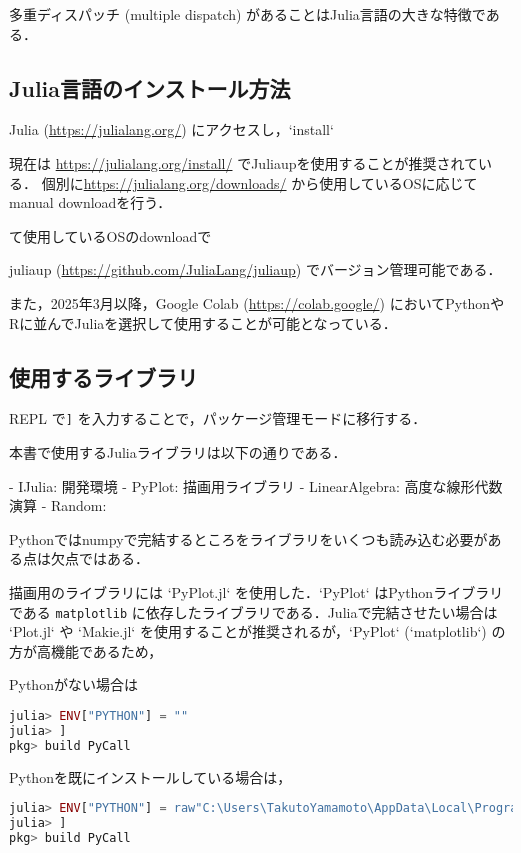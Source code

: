 \documentclass[titlepage]{ltjsbook}
\newcommand{\jl}{\lstinline[language=julia]}
\begin{document}
多重ディスパッチ (multiple dispatch) があることはJulia言語の大きな特徴である．

\subsection{Julia言語のインストール方法}
Julia (\url{https://julialang.org/}) にアクセスし，`install` 

現在は \url{https://julialang.org/install/} でJuliaupを使用することが推奨されている．
個別に\url{https://julialang.org/downloads/} から使用しているOSに応じてmanual downloadを行う．

て使用しているOSのdownloadで

juliaup (\url{https://github.com/JuliaLang/juliaup}) でバージョン管理可能である．

また，2025年3月以降，Google Colab (\url{https://colab.google/}) においてPythonやRに並んでJuliaを選択して使用することが可能となっている．

\subsection{使用するライブラリ}

REPL
で\jl{]} を入力することで，パッケージ管理モードに移行する．

本書で使用するJuliaライブラリは以下の通りである．

- IJulia: 開発環境
- PyPlot: 描画用ライブラリ
- LinearAlgebra: 高度な線形代数演算
- Random: 

Pythonではnumpyで完結するところをライブラリをいくつも読み込む必要がある点は欠点ではある．

描画用のライブラリには `PyPlot.jl` を使用した．`PyPlot` はPythonライブラリである \jl{matplotlib} に依存したライブラリである．Juliaで完結させたい場合は `Plot.jl` や `Makie.jl` を使用することが推奨されるが，`PyPlot` (`matplotlib`) の方が高機能であるため，

Pythonがない場合は

\begin{lstlisting}[language=julia]
julia> ENV["PYTHON"] = ""
julia> ]
pkg> build PyCall
\end{lstlisting}

Pythonを既にインストールしている場合は，

\begin{lstlisting}[language=julia]
julia> ENV["PYTHON"] = raw"C:\Users\TakutoYamamoto\AppData\Local\Programs\Python\Python312\python.exe"
julia> ]
pkg> build PyCall
\end{lstlisting}
\end{document}
